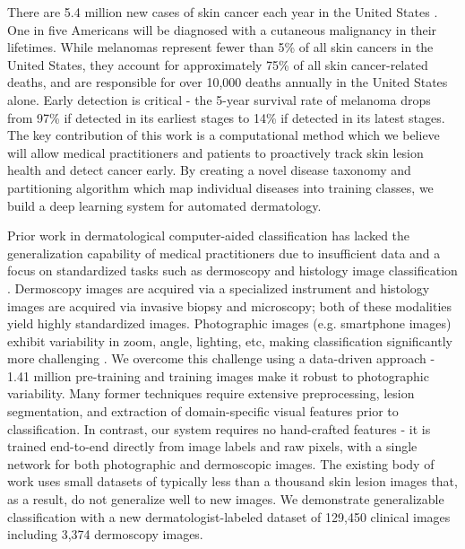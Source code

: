 There are 5.4 million new cases of skin cancer each year in the United States \cite{rogers2015incidence}. One in five Americans will be diagnosed with a cutaneous malignancy in their lifetimes. While melanomas represent fewer than 5\% of all skin cancers in the United States, they account for approximately 75\% of all skin cancer-related deaths, and are responsible for over 10,000 deaths annually in the United States alone. Early detection is critical - the 5-year survival rate of melanoma drops from 97\% if detected in its earliest stages to 14\% if detected in its latest stages. The key contribution of this work is a computational method which we believe will allow medical practitioners and patients to proactively track skin lesion health and detect cancer early. By creating a novel disease taxonomy and partitioning algorithm which map individual diseases into training classes, we build a deep learning system for automated dermatology. 

Prior work in dermatological computer-aided classification \cite{masood2013computer, rosado2003accuracy, burroni2004melanoma} has lacked the generalization capability of medical practitioners due to insufficient data and a focus on standardized tasks such as dermoscopy \cite{kittler2002diagnostic, codella2015deep, codella2018skin} and histology image classification \cite{binder1998epiluminescence, altmeyer1997skin, clark1989model, schindewolf1993classification}. Dermoscopy images are acquired via a specialized instrument and histology images are acquired via invasive biopsy and microscopy; both of these modalities yield highly standardized images. Photographic images (e.g. smartphone images) exhibit variability in zoom, angle, lighting, etc, making classification significantly more challenging \cite{ramlakhan2011mobile, ballerini2013color}. We overcome this challenge using a data-driven approach - 1.41 million pre-training and training images make it robust to photographic variability. Many former techniques require extensive preprocessing, lesion segmentation, and extraction of domain-specific visual features prior to classification. In contrast, our system requires no hand-crafted features - it is trained end-to-end directly from image labels and raw pixels, with a single network for both photographic and dermoscopic images. The existing body of work uses small datasets of typically less than a thousand skin lesion images \cite{kittler2002diagnostic, codella2018skin, binder1998epiluminescence} that, as a result, do not generalize well to new images. We demonstrate generalizable classification with a new dermatologist-labeled dataset of 129,450 clinical images including 3,374 dermoscopy images. 

